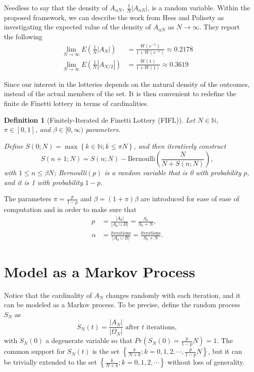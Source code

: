 \documentclass{article}
\newtheorem{definition}{Definition}
\newcommand{\N}{\mathbb{N}}
\newcommand{\card}[1]{\left| #1 \right|}
\newcommand{\sset}[1]{\left\{ #1 \right\}}
\newcommand{\ppar}[1]{\left( #1 \right)}
\begin{document}
Needless to say that the density of $A_{\alpha N}$, $\frac{1}{N}\card{ A_{\alpha N}}$, is a random variable.
%
Within the proposed framework,
we can describe the work from Hess and Polisety \cite{hess2023} as investigating the expected value of the density of $A_{\alpha N}$ as $N \rightarrow \infty$.
%
They report the following
\begin{align}
    \lim_{N \rightarrow \infty} E\ppar{\frac{1}{N}\card{ A_{N}}} 
    &=
    \frac{W\ppar{e^{-1}}}{1+W\ppar{e^{-1}}} \approx 0.2178
    \\
    \lim_{N \rightarrow \infty} E\ppar{\frac{1}{N}\card{ A_{N/2}}} 
    &=
    \frac{W\ppar{1}}{1+W\ppar{1}} \approx 0.3619
\end{align}


Since our interest in the lotteries depends on the natural density of the outcomes, instead of the actual members of the set.
%
It is then convenient to redefine the finite de Finetti lottery in terms of cardinalities.

\begin{definition}[Finitely-Iterated de Finetti Lottery (FIFL)]
Let $N\in \N$, $\pi \in [0,1]$, and $\beta \in [0, \infty)$ parameters.

Define $S\ppar{0; N} = \max\sset{k\in \N; k \leq \pi N}$, and then iteratively construct
\begin{equation}
    S\ppar{n+1; N} = S\ppar{n; N} - \text{Bernoulli}\ppar{\frac{N}{N+S\ppar{n; N}}},
\end{equation}
with $1\leq n\leq \beta N$; Bernoulli$\ppar{p}$ is a random variable that is 0 with probability $p$, and it is 1 with probability $1-p$.
\end{definition}

The parameters $\pi = \frac{p}{1-p}$ and $\beta = \ppar{1+\pi} \beta$ are introduced for ease of ease of computation and in order to make sure that
\begin{align}
    p &=
    \frac{\card{A_0}}{\card{A_0 \cup B}} = \frac{S_0}{S_0+N},
    \\
    \alpha &=
    \frac{\text{iterations}}{\card{A_0 \cup B}} =
    \frac{\text{iterations}}{S_0+N}.
\end{align}

\section{Model as a Markov Process}


Notice that the cardinality of $A_N$ changes randomly with each iteration, and it can be modeled as a Markov process. 
To be precise, define the random process $S_N$ as
\begin{equation}
    S_N(t) = \frac{\card{A_N}}{\card{\Omega_N}} \text{ after } t \text{ iterations},
\end{equation}
with $S_N(0)$ a degenerate variable so that $Pr\left(S_N(0) =  \frac{p}{1-p}N\right)=1$.
%
The common support for $S_N(t)$ is the set $\sset{\frac{k}{N+k}; k = 0, 1, 2, \cdots, \frac{p}{1-p}N}$, but it can be trivially extended to the set $\sset{\frac{k}{N+k}; k = 0, 1, 2, \cdots}$ without loss of generality.
\end{document}
